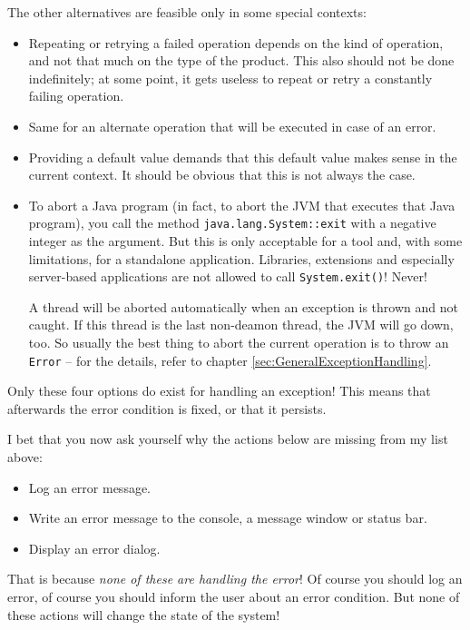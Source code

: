 \documentclass[11pt,a4paper, titlepage, parskip=half, headsepline, footsepline, cleardoublepage=current, headheight=1cm]{scrbook}
\newcommand*{\tqref}[1]{\hyperref[{#1}]{\ref*{#1}}}
\begin{document}
The other alternatives are feasible only in some special contexts:
\begin{itemize}
\item{Repeating or retrying a failed operation depends on the kind of operation, and not that much on the type of the product. This also should not be done indefinitely; at some point, it gets useless to repeat or retry a constantly failing operation.}

\item{Same for an alternate operation that will be executed in case of an error.}

\item{Providing a default value demands that this default value makes sense in the current context. It should be obvious that this is not always the case.}

\item{To abort a Java program (in fact, to abort the JVM that executes that Java program), you call the method \lstinline|java.lang.System::exit|\autocite{ORACLE_DOC_SYSTEM_CLASS:exit} with a negative integer as the argument. But this is only acceptable for a tool and, with some limitations, for a standalone application. Libraries, extensions and especially server-based applications are not allowed to call \lstinline|System.exit()|! Never!

A thread will be aborted automatically when an exception is thrown and not caught. If this thread is the last non-deamon thread, the JVM will go down, too. So usually the best thing to abort the current operation is to throw an \lstinline|Error| – for the details, refer to chapter \tqref{sec:GeneralExceptionHandling}.}
\end{itemize}

Only these four options do exist for handling an exception! This means that afterwards the error condition is fixed, or that it persists.

I bet that you now ask yourself why the actions below are missing from my list above:
\begin{itemize}
\item{Log an error message.}
\item{Write an error message to the console, a message window or status bar.}
\item{Display an error dialog.}
\end{itemize}

That is because \textit{none of these are handling the error}! Of course you should log an error, of course you should inform the user about an error condition. But none of these actions will change the state of the system!
\end{document}
